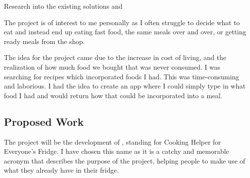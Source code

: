 \documentclass[../CHEFCookingHelperForEveryonesFridge.tex]{subfiles}
\renewcommand{\cite}[1]{\parencite{#1}}
\begin{document}
Research into the existing solutions \cite{myfridgefood_myfridgefood_nodate} and \cite{supercook_supercook_nodate}

The project is of interest to me personally as I often struggle to decide what to eat and instead end up eating fast food,
the same meals over and over, or getting ready meals from the shop.

The idea for the project came due to the increase in cost of living, and the realization of how much food we bought that was
never consumed. I was searching for recipes which incorporated foods I had. This was time-consuming and laborious.
I had the idea to create an app where I could simply type in what food I had and would return how that could be incorporated
into a meal.



\subsection{Proposed Work}
The project will be the development of \chef{}, standing for Cooking Helper for Everyone's Fridge. I have chosen this name
as it is a catchy and memorable acronym that describes the purpose of the project, helping people to make use of
what they already have in their fridge.
\end{document}
